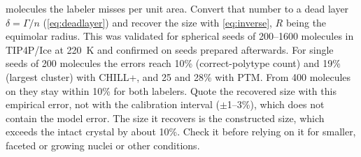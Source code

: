 \documentclass[11pt,a4paper]{article}
\begin{document}
\begin{enumerate}
molecules the labeler misses per unit area. Convert that number to a dead
layer $\delta=\Gamma/n$ (\cref{eq:deadlayer}) and recover the size with
\cref{eq:inverse}, $R$ being the equimolar radius. This was validated for
spherical seeds of 200--1600 molecules in TIP4P/Ice at 220~K and confirmed on
seeds prepared afterwards. For single seeds of 200 molecules the errors reach
10\% (correct-polytype count) and 19\% (largest cluster) with CHILL+, and 25 and
28\% with PTM. From 400 molecules on they stay within 10\% for both labelers. Quote the
recovered size with this empirical error, not with the calibration interval
($\pm$1--3\%), which does not contain the model error. The size it recovers
is the constructed size, which exceeds the intact crystal by about 10\%. Check it before relying on it for smaller, faceted or growing nuclei or
other conditions.
\end{enumerate}
\end{document}
